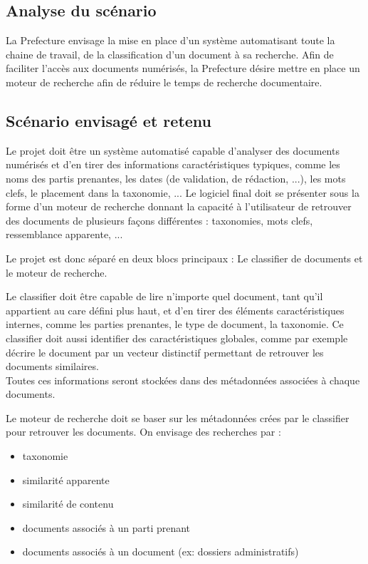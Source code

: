
\subsection {Analyse du scénario}
La Prefecture envisage la mise en place d'un système automatisant toute la chaine de travail, de la classification d'un document à sa recherche.
Afin de faciliter l'accès aux documents numérisés, la Prefecture désire mettre en place un moteur de recherche afin de réduire le temps de recherche documentaire.



\subsection {Scénario envisagé et retenu}
Le projet doit être un système automatisé capable d'analyser des documents numérisés et d'en tirer des informations caractéristiques typiques, comme les noms des partis prenantes,  les dates (de validation, de rédaction, ...), les mots clefs, le placement dans la taxonomie, ...
Le logiciel final doit se présenter sous la forme d'un moteur de recherche donnant la capacité à l'utilisateur de retrouver des documents de plusieurs façons différentes : taxonomies, mots clefs, ressemblance apparente, ...
\\
\par
Le projet est donc séparé en deux blocs principaux :
Le classifier de documents et le moteur de recherche.

Le classifier doit être capable de lire n'importe quel document, tant qu'il appartient au care défini plus haut, et d'en tirer des éléments caractéristiques internes, comme les parties prenantes, le type de document, la taxonomie.
Ce classifier doit aussi identifier des caractéristiques globales, comme par exemple décrire le document par un vecteur distinctif permettant de retrouver les documents similaires.
\\
Toutes ces informations seront stockées dans des métadonnées associées à chaque documents.


Le moteur de recherche doit se baser sur les métadonnées crées par le classifier pour retrouver les documents.
On envisage des recherches par :
\begin {itemize}
\item taxonomie
\item similarité apparente
\item similarité de contenu
\item documents associés à un parti prenant 
\item documents associés à un document (ex: dossiers administratifs)
\end {itemize}



